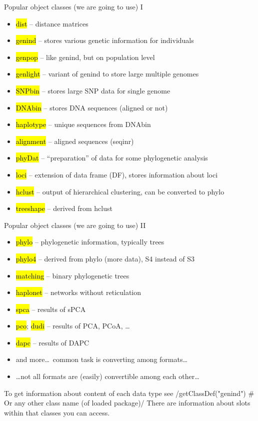 \documentclass[compress, ucs, xelatex, 11pt, xcolor=svgnames,
  hyperref={
    bookmarks=true,
    unicode=true,
    colorlinks=true,
    pdftitle={Molecular data in R},
    plainpages=false,
    pdfauthor={Vojtech Zeisek},
    pdfsubject={Course about phylogeny and evolution in R},
    pdfcreator={XeLaTeX},
    pdfkeywords={R, evolution, phylogeny, molecular data},
    linkcolor=Tomato,
    anchorcolor=SaddleBrown,
    citecolor=Goldenrod,
    filecolor=DarkMagenta,
    menucolor=Sienna,
    urlcolor=DarkTurquoise,
    pdftex},
  url={hyphens, lowtilde} %
  ]{beamer}
\renewcommand{\texttt}[1]{\hl{\ttfamily #1}}
\begin{document}
\begin{frame}{Popular object classes (we are going to use) I}
\begin{itemize}
 \item \texttt{dist} -- distance matrices
 \item \texttt{genind} -- stores various genetic information for individuals
 \item \texttt{genpop} -- like genind, but on population level
 \item \texttt{genlight} -- variant of genind to store large multiple genomes
 \item \texttt{SNPbin} -- stores large SNP data for single genome
 \item \texttt{DNAbin} -- stores DNA sequences (aligned or not)
 \item \texttt{haplotype} -- unique sequences from DNAbin
 \item \texttt{alignment} -- aligned sequences (seqinr)
 \item \texttt{phyDat} -- ``preparation'' of data for some phylogenetic analysis
 \item \texttt{loci} -- extension of data frame (DF), stores information about loci
 \item \texttt{hclust} -- output of hierarchical clustering, can be converted to phylo
 \item \texttt{treeshape} -- derived from hclust
\end{itemize}
\end{frame}

\begin{frame}[fragile]{Popular object classes (we are going to use) II}
\begin{itemize}
 \item \texttt{phylo} -- phylogenetic information, typically trees
 \item \texttt{phylo4} -- derived from phylo (more data), S4 instead of S3
 \item \texttt{matching} -- binary phylogenetic trees
 \item \texttt{haplonet} -- networks without reticulation
 \item \texttt{spca} -- results of sPCA
 \item \texttt{pco}; \texttt{dudi} -- results of PCA, PCoA, \ldots
 \item \texttt{dapc} -- results of DAPC
 \item and more\ldots~common task is converting among formats\ldots
 \item \ldots not all formats are (easily) convertible among each other\ldots
\end{itemize}
To get information about content of each data type see
\splus/getClassDef("genind") # Or any other class name (of loaded package)/
There are information about slots within that classes you can access.
\end{frame}
\end{document}
